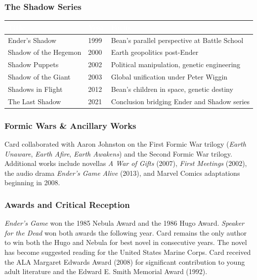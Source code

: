 \documentclass[11pt,letterpaper]{article}
\newcommand{\tableheader}[1]{\textbf{\sffamily\textcolor{white}{#1}}}
\begin{document}
\subsubsection{The Shadow Series}

\begin{center}
\begin{tabularx}{\textwidth}{L{4cm}C{1.5cm}X}
\toprule
{}
\tableheader{Title} & \tableheader{Year} & \tableheader{Focus} \\
\midrule
Ender's Shadow & 1999 & Bean's parallel perspective at Battle School \\
Shadow of the Hegemon & 2000 & Earth geopolitics post-Ender \\
Shadow Puppets & 2002 & Political manipulation, genetic engineering \\
Shadow of the Giant & 2003 & Global unification under Peter Wiggin \\
Shadows in Flight & 2012 & Bean's children in space, genetic destiny \\
The Last Shadow & 2021 & Conclusion bridging Ender and Shadow series \\
\bottomrule
\end{tabularx}
\end{center}

\subsubsection{Formic Wars \& Ancillary Works}

Card collaborated with Aaron Johnston on the First Formic War trilogy (\textit{Earth Unaware}, \textit{Earth Afire}, \textit{Earth Awakens}) and the Second Formic War trilogy. Additional works include novellas \textit{A War of Gifts} (2007), \textit{First Meetings} (2002), the audio drama \textit{Ender's Game Alive} (2013), and Marvel Comics adaptations beginning in 2008.

\subsubsection{Awards and Critical Reception}

\textit{Ender's Game} won the 1985 Nebula Award and the 1986 Hugo Award. \textit{Speaker for the Dead} won both awards the following year. Card remains the only author to win both the Hugo and Nebula for best novel in consecutive years. The novel has become suggested reading for the United States Marine Corps. Card received the ALA Margaret Edwards Award (2008) for significant contribution to young adult literature and the Edward E. Smith Memorial Award (1992).
\end{document}
